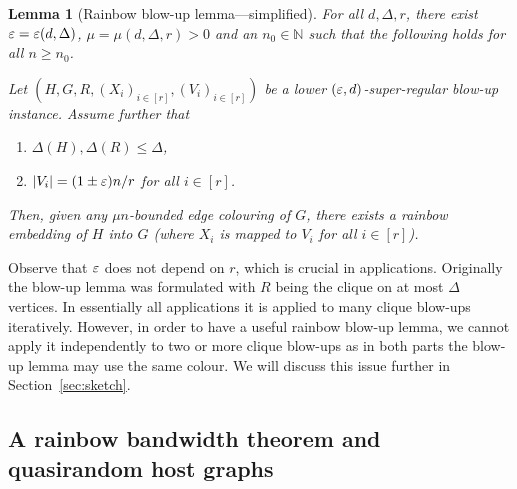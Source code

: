 \documentclass[10pt]{amsart}
\newtheorem{lemma}[algorithm]{Lemma}
\theoremstyle{definition}
\theoremstyle{claimstyle}
\theoremstyle{stepstyle}
\numberwithin{equation}{section}
\begin{document}
\begin{lemma}[Rainbow blow-up lemma---simplified]\label{lem:blow-up simple}
For all $d,\Delta,r$,
there exist ${\varepsilon}={\varepsilon}(d,\Delta)$, $\mu=\mu(d,\Delta,r)>0$ and an $n_0\in \mathbb{N}$
such that the following holds for all $n\geq n_0$.

Let $(H,G,R,(X_i)_{i\in[r]},(V_i)_{i\in[r]})$ be a lower $({\varepsilon},d)$-super-regular blow-up instance.
Assume further that
\begin{enumerate}[label={\rm (\roman*)}]
	\item $\Delta(H), \Delta(R)\leq \Delta$,
	\item $|V_i|=(1\pm {\varepsilon})n/r$ for all $i\in[r]$.
\end{enumerate}
Then, given any $\mu n$-bounded edge colouring of $G$,
there exists a rainbow embedding of $H$ into $G$ (where $X_i$ is mapped to $V_i$ for all $i\in [r]$).
\end{lemma}

Observe that ${\varepsilon}$ does not depend on $r$, which is crucial in applications. Originally the blow-up lemma was formulated with $R$ being the clique on at most $\Delta$ vertices.
In essentially all applications it is applied to many clique blow-ups iteratively.
However, in order to have a useful rainbow blow-up lemma,
we cannot apply it independently to two or more clique blow-ups as
in both parts the blow-up lemma may use the same colour.
We will discuss this issue further in Section~\ref{sec:sketch}.








\subsection{A rainbow bandwidth theorem and quasirandom host graphs} \label{subsec:intro bandwidth}
\end{document}
